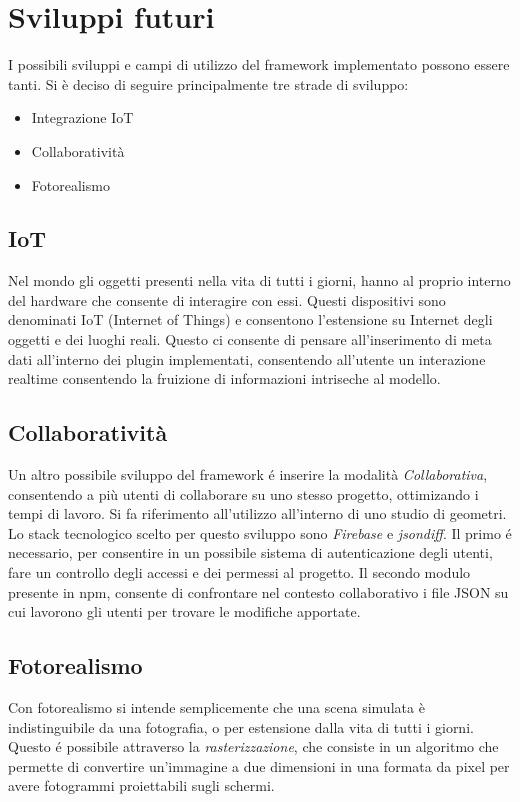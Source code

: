 \section{Sviluppi futuri}
\label{sec:conclusions_section_2}

I possibili sviluppi e campi di utilizzo del framework implementato possono essere tanti.
Si \`e deciso di seguire principalmente tre strade di sviluppo:
\begin{itemize}
\item Integrazione IoT
\item Collaboratività
\item Fotorealismo
\end{itemize}
\newpage

\subsection{IoT}
Nel mondo gli oggetti presenti nella vita di tutti i giorni, hanno al proprio interno del hardware che consente di interagire
con essi. Questi dispositivi sono denominati IoT (Internet of Things) e consentono l'estensione su Internet degli oggetti e dei
luoghi reali. Questo ci consente di pensare all'inserimento di meta dati all'interno dei plugin implementati,
consentendo all'utente un interazione realtime consentendo la fruizione di informazioni
intriseche al modello.

\newpage

\subsection{Collaboratività}

Un altro possibile sviluppo del framework \'e inserire la modalità \emph{Collaborativa}, consentendo a più utenti
di collaborare su uno stesso progetto, ottimizando i tempi di lavoro. Si fa riferimento
all'utilizzo all'interno di uno studio di geometri. Lo stack tecnologico scelto per questo sviluppo sono
\emph{Firebase} e \emph{jsondiff}. Il primo \'e necessario, per consentire in un possibile sistema di autenticazione degli utenti,
fare un controllo degli accessi e dei permessi al progetto.
Il secondo modulo presente in npm, consente di confrontare nel contesto collaborativo i file JSON su cui lavorono
gli utenti per trovare le modifiche apportate.


\newpage

\subsection{Fotorealismo}
Con fotorealismo si intende semplicemente che una scena simulata \`e indistinguibile da una fotografia, o per estensione
dalla vita di tutti i giorni. Questo \'e possibile attraverso la \emph{rasterizzazione}, che consiste in un algoritmo che
permette di convertire un'immagine a due dimensioni in una formata da pixel per avere fotogrammi proiettabili sugli schermi.

